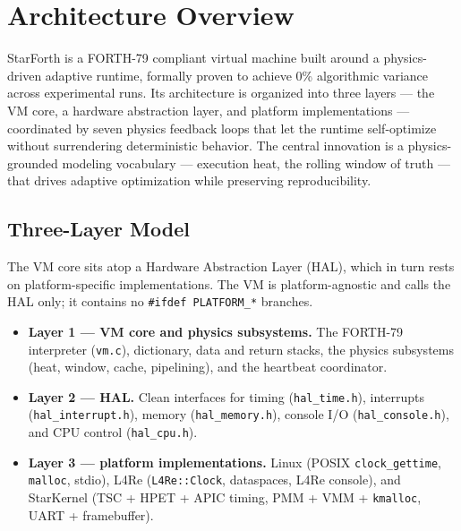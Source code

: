 
\section{Architecture Overview}

StarForth is a FORTH-79 compliant virtual machine built around a
physics-driven adaptive runtime, formally proven to achieve 0\% algorithmic
variance across experimental runs. Its architecture is organized into three
layers --- the VM core, a hardware abstraction layer, and platform
implementations --- coordinated by seven physics feedback loops that let the
runtime self-optimize without surrendering deterministic behavior. The central
innovation is a physics-grounded modeling vocabulary --- execution heat, the
rolling window of truth --- that drives adaptive optimization while preserving
reproducibility.

\subsection{Three-Layer Model}

The VM core sits atop a Hardware Abstraction Layer (HAL), which in turn rests on
platform-specific implementations. The VM is platform-agnostic and calls the
HAL only; it contains no \texttt{\#ifdef PLATFORM\_*} branches.

\begin{itemize}
  \item \textbf{Layer 1 --- VM core and physics subsystems.} The FORTH-79
    interpreter (\texttt{vm.c}), dictionary, data and return stacks, the physics
    subsystems (heat, window, cache, pipelining), and the heartbeat coordinator.
  \item \textbf{Layer 2 --- HAL.} Clean interfaces for timing
    (\texttt{hal\_time.h}), interrupts (\texttt{hal\_interrupt.h}), memory
    (\texttt{hal\_memory.h}), console I/O (\texttt{hal\_console.h}), and CPU
    control (\texttt{hal\_cpu.h}).
  \item \textbf{Layer 3 --- platform implementations.} Linux (POSIX
    \texttt{clock\_gettime}, \texttt{malloc}, stdio), L4Re
    (\texttt{L4Re::Clock}, dataspaces, L4Re console), and StarKernel (TSC +
    HPET + APIC timing, PMM + VMM + \texttt{kmalloc}, UART + framebuffer).
\end{itemize}

